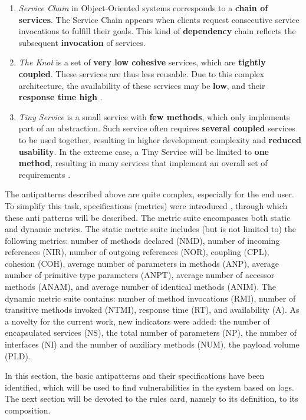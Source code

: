 \documentclass[12pt, times]{article}
\begin{document}
\begin{enumerate}
		\item \textit{Service Chain} \cite{book_2} in Object-Oriented systems corresponds to a \textbf{chain of services}. The Service Chain appears when clients request consecutive service invocations to fulfill their goals. This kind of \textbf{dependency} chain reflects the subsequent \textbf{invocation} of services.
		\item \textit{The Knot} is a set of \textbf{very low cohesive} services, which are \textbf{tightly coupled}. These services are thus less reusable. Due to this complex architecture, the availability of these services may be \textbf{low}, and their \textbf{response time high} \cite{book_3}.
		\item \textit{Tiny Service} is a small service with \textbf{few methods}, which only implements part of an abstraction. Such service often requires \textbf{several coupled} services to be used together, resulting in higher development complexity and \textbf{reduced usability}. In the extreme case, a Tiny Service will be limited to \textbf{one method}, resulting in many services that implement an overall set of requirements \cite{book_1}.
	\end{enumerate}
	
	\hspace*{5mm} The antipatterns described above are quite complex, especially for the end user. To simplify this task, specifications (metrics) were introduced \cite{soda}, through which these anti patterns will be described. The metric suite encompasses both static and dynamic metrics. The static metric suite includes (but is not limited to) the following metrics: number of methods declared (NMD), number of incoming references (NIR), number of outgoing references (NOR), coupling (CPL), cohesion (COH), average number of parameters in methods (ANP), average number of primitive type parameters (ANPT), average number of accessor methods (ANAM), and average number of identical methods (ANIM). The dynamic metric suite contains: number of method invocations (RMI), number of transitive methods invoked (NTMI), response time (RT), and availability (A). As a novelty for the current work, new indicators were added: the number of encapsulated services (NS), the total number of parameters (NP), the number of interfaces (NI) and the number of auxiliary methods (NUM), the payload volume (PLD).
	
	\hspace*{5mm} In this section, the basic antipatterns and their specifications have been identified, which will be used to find vulnerabilities in the system based on logs. The next section will be devoted to the rules card, namely to its definition, to its composition.
	
\end{document}
